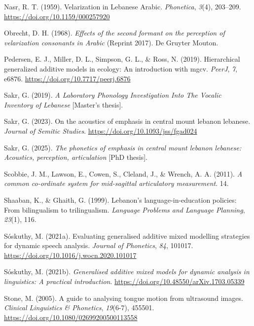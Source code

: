 \documentclass[
  man,
  longtable,
  nolmodern,
  notxfonts,
  notimes,
  colorlinks=true,linkcolor=blue,citecolor=blue,urlcolor=blue]{apa7}
\newlength{\cslhangindent}
\newenvironment{CSLReferences}[2] %
 {\begin{list}{}{%
  \setlength{\itemindent}{0pt}
  \setlength{\leftmargin}{0pt}
  \setlength{\parsep}{0pt}
  \ifodd #1
   \setlength{\leftmargin}{\cslhangindent}
   \setlength{\itemindent}{-1\cslhangindent}
  \fi
  \setlength{\itemsep}{#2\baselineskip}}}
 {\end{list}}
\begin{document}
\begin{CSLReferences}{1}{0}
Nasr, R. T. (1959). Velarization in Lebanese Arabic. \emph{Phonetica},
\emph{3}(4), 203--209. \url{https://doi.org/10.1159/000257920}

Obrecht, D. H. (1968). \emph{Effects of the second formant on the
perception of velarization consonants in Arabic} (Reprint 2017). De
Gruyter Mouton.

Pedersen, E. J., Miller, D. L., Simpson, G. L., \& Ross, N. (2019).
Hierarchical generalized additive models in ecology: An introduction
with mgcv. \emph{PeerJ}, \emph{7}, e6876.
\url{https://doi.org/10.7717/peerj.6876}

Sakr, G. (2019). \emph{A Laboratory Phonology Investigation Into The
Vocalic Inventory of Lebanese} {[}Master's thesis{]}.

Sakr, G. (2023). On the acoustics of emphasis in central mount lebanon
lebanese. \emph{Journal of Semitic Studies}.
\url{https://doi.org/10.1093/jss/fgad024}

Sakr, G. (2025). \emph{The phonetics of emphasis in central mount
lebanon lebanese: Acoustics, perception, articulation} {[}PhD thesis{]}.

Scobbie, J. M., Lawson, E., Cowen, S., Cleland, J., \& Wrench, A. A.
(2011). \emph{A common co-ordinate system for mid-sagittal articulatory
measurement}. 14.

Shaaban, K., \& Ghaith, G. (1999). Lebanon's language-in-education
policies: From bilingualism to trilingualism. \emph{Language Problems
and Language Planning}, \emph{23}(1), 116.

Sóskuthy, M. (2021a). Evaluating generalised additive mixed modelling
strategies for dynamic speech analysis. \emph{Journal of Phonetics},
\emph{84}, 101017. \url{https://doi.org/10.1016/j.wocn.2020.101017}

Sóskuthy, M. (2021b). \emph{Generalised additive mixed models for
dynamic analysis in linguistics: A practical introduction}.
\url{https://doi.org/10.48550/arXiv.1703.05339}

Stone, M. (2005). A guide to analysing tongue motion from ultrasound
images. \emph{Clinical Linguistics \& Phonetics}, \emph{19}(6-7),
455501. \url{https://doi.org/10.1080/02699200500113558}


\end{CSLReferences}
\end{document}
